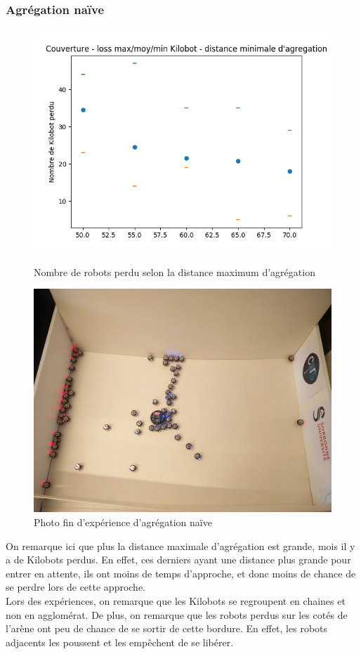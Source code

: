 \documentclass[a4paper]{article}
\begin{document}
\subsubsection{Agrégation naïve}
\begin{figure}[h]
	\begin{minipage}[c]{.46\linewidth}
		\centering
		\includegraphics[width=1.1\linewidth]{../../script_results/Agregation_naive_loss}
		\caption{Nombre de robots perdu selon la distance maximum d'agrégation}
	\end{minipage}
	\hfill%
	\begin{minipage}[c]{.46\linewidth}
		\centering
		\includegraphics[width=1.1\linewidth]{../../script_results/Resultats_aggreg_naive.jpg}
		\caption{Photo fin d'expérience d'agrégation naïve}
	\end{minipage}
\end{figure}
On remarque ici que plus la distance maximale d'agrégation est grande, mois il y a de Kilobots perdus. En effet, ces derniers ayant une distance plus grande pour entrer en attente, ils ont moins de temps d'approche, et donc moins de chance de se perdre lors de cette approche.\\
Lors des expériences, on remarque que les Kilobots se regroupent en chaines et non en agglomérat. De plus, on remarque que les robots perdus sur les cotés de l'arène ont peu de chance de se sortir de cette bordure. En effet, les robots adjacents les poussent et les empêchent de se libérer.
\newpage
\end{document}
